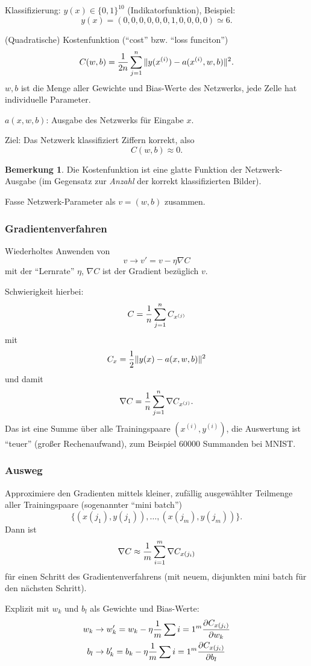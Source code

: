 \documentclass[
 a4paper,
 12pt,
 parskip=half
 ]{scrreprt}
\theoremstyle{plain}
\theoremstyle{definition}
\newtheorem*{rmrk*}{Bemerkung}
\begin{document}
Klassifizierung: $y(x) \in \{0,1\}^{10}$ (Indikatorfunktion), Beispiel:
\[ y(x) = (0,0,0,0,0,0,1,0,0,0,0) \simeq 6. \]

(Quadratische) Kostenfunktion (``cost'' bzw. ``loss funciton'')
\[ C(w,b) = \frac{1}{2n} \sum_{j=1}^n \| y(x^{(i)}) - a(x^{(i)}, w, b) \|^2. \]
$w, b$ ist die Menge aller Gewichte und Bias-Werte des Netzwerks, jede Zelle hat
individuelle Parameter.

$a(x,w,b)$: Ausgabe des Netzwerks für Eingabe $x$.

Ziel: Das Netzwerk klassifiziert Ziffern korrekt, also
\[ C( w, b ) \approx 0. \]

\begin{rmrk*}
  Die Kostenfunktion ist eine glatte Funktion der Netzwerk-Ausgabe (im Gegensatz
  zur \emph{Anzahl} der korrekt klassifizierten Bilder).
\end{rmrk*}

Fasse Netzwerk-Parameter als $v = (w,b)$ zusammen.

\subsubsection*{Gradientenverfahren}
Wiederholtes Anwenden von
\[ v \to v' = v - \eta \nabla C \]
mit der ``Lernrate'' $\eta$, $\nabla C$ ist der Gradient bezüglich $v$.

Schwierigkeit hierbei:
\[ C = \frac{1}{n} \sum_{j=1}^n C_{x^{(j)}} \]
mit 
\[  C_x = \frac{1}{2} \| y(x) - a(x,w,b) \|^2 \]
und damit
\[ \nabla C = \frac{1}{n} \sum_{j=1}^n \nabla C_{x^{(j)}}. \]
Das ist eine Summe über alle Trainingspaare $(x^{(i)},y^{(i)})$, die Auswertung
ist ``teuer'' (großer Rechenaufwand), zum Beispiel 60000 Summanden bei
MNIST.

\subsubsection*{Ausweg}
Approximiere den Gradienten mittels kleiner, zufällig ausgewählter Teilmenge
aller Trainingspaare (sogenannter ``mini batch'')
\[ \{ (x(j_1), y(j_1)), \ldots, (x(j_m), y(j_m)) \}. \]
Dann ist
\[ \nabla C \approx \frac{1}{m} \sum_{i=1}^m \nabla C_{x(j_i)} \]
für einen Schritt des Gradientenverfahrens (mit neuem, disjunkten mini batch für
den nächsten Schritt).

Explizit mit $w_k$ und $b_l$ als Gewichte und Bias-Werte:
\begin{align*}
  w_k &\to w'_k = w_k - \eta \frac{1}{m} \sum{i=1}^m \frac{\partial C_{x(j_i)}}{\partial w_k} \\
  b_l &\to b'_k = b_k - \eta \frac{1}{m} \sum{i=1}^m \frac{\partial C_{x(j_i)}}{\partial b_l}
\end{align*}
\end{document}
